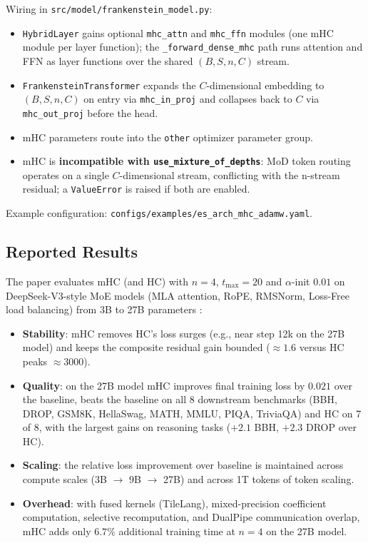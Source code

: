 Wiring in \texttt{src/model/frankenstein\_model.py}:
\begin{itemize}[leftmargin=*]
    \item \texttt{HybridLayer} gains optional \texttt{mhc\_attn} and
        \texttt{mhc\_ffn} modules (one mHC module per layer function); the
        \texttt{\_forward\_dense\_mhc} path runs attention and FFN as layer
        functions over the shared $(B, S, n, C)$ stream.
    \item \texttt{FrankensteinTransformer} expands the $C$-dimensional
        embedding to $(B, S, n, C)$ on entry via \texttt{mhc\_in\_proj} and
        collapses back to $C$ via \texttt{mhc\_out\_proj} before the head.
    \item mHC parameters route into the \texttt{other} optimizer parameter
        group.
    \item mHC is \textbf{incompatible with \texttt{use\_mixture\_of\_depths}}:
        MoD token routing operates on a single $C$-dimensional stream,
        conflicting with the n-stream residual; a \texttt{ValueError} is raised
        if both are enabled.
\end{itemize}

Example configuration: \texttt{configs/examples/es\_arch\_mhc\_adamw.yaml}.

\subsection{Reported Results}

The paper evaluates mHC (and HC) with $n = 4$, $t_{\max} = 20$ and
$\alpha$-init $0.01$ on DeepSeek-V3-style MoE models (MLA attention, RoPE,
RMSNorm, Loss-Free load balancing) from 3B to 27B parameters
\citep{xie_mhc_2025}:
\begin{itemize}[leftmargin=*]
    \item \textbf{Stability}: mHC removes HC's loss surges (e.g., near step
        12k on the 27B model) and keeps the composite residual gain bounded
        ($\approx 1.6$ versus HC peaks $\approx 3000$).
    \item \textbf{Quality}: on the 27B model mHC improves final training loss
        by $0.021$ over the baseline, beats the baseline on all 8 downstream
        benchmarks (BBH, DROP, GSM8K, HellaSwag, MATH, MMLU, PIQA, TriviaQA)
        and HC on 7 of 8, with the largest gains on reasoning tasks
        ($+2.1$ BBH, $+2.3$ DROP over HC).
    \item \textbf{Scaling}: the relative loss improvement over baseline is
        maintained across compute scales (3B $\to$ 9B $\to$ 27B) and across
        1T tokens of token scaling.
    \item \textbf{Overhead}: with fused kernels (TileLang), mixed-precision
        coefficient computation, selective recomputation, and DualPipe
        communication overlap, mHC adds only $6.7\%$ additional training time
        at $n = 4$ on the 27B model.
\end{itemize}

